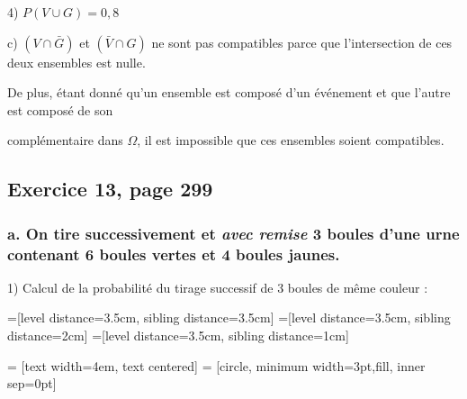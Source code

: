 \documentclass[10pt]{article}
\begin{document}
\hspace{10pt}4) $P(V\cup G)=0,8$\vspace{4pt}\vspace{6pt}

c) $(V\cap \bar{G})$ et $(\bar{V} \cap G)$ ne sont pas compatibles parce que l'intersection de ces deux ensembles est nulle. 

\hspace{12pt}De plus, étant donné qu'un ensemble est composé d'un événement et que l'autre est composé de son 

\hspace{12pt}complémentaire dans  $\Omega$, il est impossible que ces ensembles soient compatibles.

\subsection*{Exercice 13, page 299}
\subsubsection*{a. On tire successivement et \textit{avec remise} 3 boules d'une urne contenant 6 boules vertes et 4 boules jaunes.}

\hspace{16pt}1) Calcul de la probabilité du tirage successif de 3 boules de même couleur :\vspace{1cm}


=[level distance=3.5cm, sibling distance=3.5cm]
=[level distance=3.5cm, sibling distance=2cm]
=[level distance=3.5cm, sibling distance=1cm]

 = [text width=4em, text centered]
 = [circle, minimum width=3pt,fill, inner sep=0pt]
\end{document}
